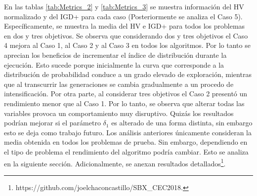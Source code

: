 En las tablas \ref{tab:Metrics_2} y \ref{tab:Metrics_3} se muestra información del HV normalizado \cite{zitzler1999multiobjective} y del IGD+ \cite{Joel:IGDPlus_And_GDPlus} para cada caso (Posteriormente se analiza el Caso 5).
%
Específicamente, se muestra la media del HV e IGD+ para todos los problemas en dos y tres objetivos.
%
Se observa que considerando dos y tres objetivos el Caso 4 mejora al Caso 1, al Caso 2 y al Caso 3 en todos los algoritmos.
%
Por lo tanto se aprecian los beneficios de incrementar el índice de distribución durante la ejecución.
%
Esto sucede porque inicialmente la curva que corresponde a la distribución de probabilidad conduce a un grado elevado de exploración, mientras que al transcurrir las generaciones se cambia gradualmente a un procedo de intensificación.
%
Por otra parte, al considerar tres objetivos el Caso 2 presentó un rendimiento menor que al Caso 1.
%
Por lo tanto, se observa que alterar todas las variables provoca un comportamiento muy disruptivo.
%
Quizás los resultados podrían mejorar si el parámetro $\delta_1$ es alterado de una forma distinta, sin embargo esto se deja como trabajo futuro.
Los análisis anteriores únicamente consideran la media obtenida en todos los problemas de prueba.
%
Sin embargo, dependiendo en el tipo de problema el rendimiento del algoritmo podría cambiar.
%
Esto se analiza en la siguiente sección.
%
Adicionalmente, se anexan resultados detallados\footnote{https:\//\//github.com\//joelchaconcastillo\//SBX\_CEC2018.}.


